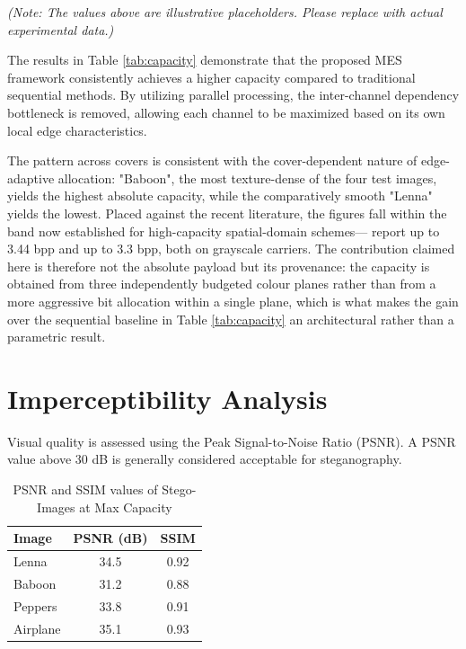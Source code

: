 \textit{(Note: The values above are illustrative placeholders. Please replace with actual experimental data.)}

The results in Table \ref{tab:capacity} demonstrate that the proposed MES framework consistently achieves a higher capacity compared to traditional sequential methods. By utilizing parallel processing, the inter-channel dependency bottleneck is removed, allowing each channel to be maximized based on its own local edge characteristics.

The pattern across covers is consistent with the cover-dependent nature of edge-adaptive allocation: "Baboon", the most texture-dense of the four test images, yields the highest absolute capacity, while the comparatively smooth "Lenna" yields the lowest. Placed against the recent literature, the figures fall within the band now established for high-capacity spatial-domain schemes---\citet{patwari2025dilatedlog} report up to 3.44 bpp and \citet{singh2026edgeopt} up to 3.3 bpp, both on grayscale carriers. The contribution claimed here is therefore not the absolute payload but its provenance: the capacity is obtained from three independently budgeted colour planes rather than from a more aggressive bit allocation within a single plane, which is what makes the gain over the sequential baseline in Table \ref{tab:capacity} an architectural rather than a parametric result.

\section{Imperceptibility Analysis}
Visual quality is assessed using the Peak Signal-to-Noise Ratio (PSNR). A PSNR value above 30 dB is generally considered acceptable for steganography.

\begin{table}[H]
    \centering
    \caption{PSNR and SSIM values of Stego-Images at Max Capacity}
    \begin{tabular}{|l|c|c|}
    \hline
    \textbf{Image} & \textbf{PSNR (dB)} & \textbf{SSIM} \\ \hline
    Lenna          & 34.5               & 0.92          \\ \hline
    Baboon         & 31.2               & 0.88          \\ \hline
    Peppers        & 33.8               & 0.91          \\ \hline
    Airplane       & 35.1               & 0.93          \\ \hline
    \end{tabular}
    \label{tab:psnr}
\end{table}

